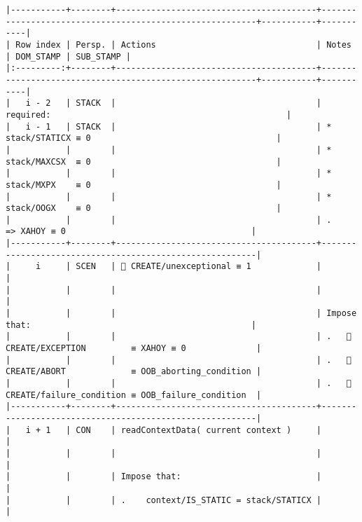 \documentclass[varwidth=\maxdimen,margin=0.5cm,multi={verbatim}]{standalone}
\begin{document}
\begin{verbatim}
|-----------+--------+----------------------------------------+---------------------------------------------------------+-----------+-----------|
| Row index | Persp. | Actions                                | Notes                                                   | DOM_STAMP | SUB_STAMP |
|:---------:+--------+----------------------------------------+---------------------------------------------------------+-----------+-----------|
|   i - 2   | STACK  |                                        | required:                                               |
|   i - 1   | STACK  |                                        | * stack/STATICX ≡ 0                                     |
|           |        |                                        | * stack/MAXCSX  ≡ 0                                     |
|           |        |                                        | * stack/MXPX    ≡ 0                                     |
|           |        |                                        | * stack/OOGX    ≡ 0                                     |
|           |        |                                        | .      => XAHOY ≡ 0                                     |
|-----------+--------+----------------------------------------+---------------------------------------------------------|
|     i     | SCEN   |  CREATE/unexceptional ≡ 1             |                                                         |
|           |        |                                        |                                                         |
|           |        |                                        | Impose that:                                            |
|           |        |                                        | .    CREATE/EXCEPTION         ≡ XAHOY ≡ 0              |
|           |        |                                        | .    CREATE/ABORT             ≡ OOB_aborting_condition |
|           |        |                                        | .    CREATE/failure_condition ≡ OOB_failure_condition  |
|-----------+--------+----------------------------------------+---------------------------------------------------------|
|   i + 1   | CON    | readContextData( current context )     |                                                         |
|           |        |                                        |                                                         |
|           |        | Impose that:                           |                                                         |
|           |        | .    context/IS_STATIC = stack/STATICX |                                                         |

\end{verbatim}
\end{document}
